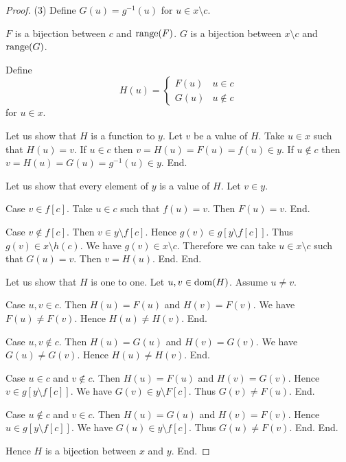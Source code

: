 \documentclass[../../sets-and-functions.ftl.tex]{subfiles}
\begin{document}
\begin{forthel}
\begin{proof}
        (3) Define $G(u) = g^{-1}(u)$ for $u \in x \setminus c$.

        $F$ is a bijection between $c$ and $\text{range}(F)$.
        $G$ is a bijection between $x \setminus c$ and $\text{range}(G)$.

        Define
          $$H(u) =
          \begin{cases}
            F(u) & u \in c \\
            G(u) & u \notin c
          \end{cases}$$
        for $u \in x$.

        Let us show that $H$ is a function to $y$.
          Let $v$ be a value of $H$.
          Take $u \in x$ such that $H(u) = v$.
          If $u \in c$ then $v = H(u) = F(u) = f(u) \in y$.
          If $u \notin c$ then $v = H(u) = G(u) = g^{-1}(u) \in y$.
        End.

        Let us show that every element of $y$ is a value of $H$.
          Let $v \in y$.

          Case $v \in f[c]$.
            Take $u \in c$ such that $f(u) = v$.
            Then $F(u) = v$.
          End.

          Case $v \notin f[c]$.
            Then $v \in y \setminus f[c]$.
            Hence $g(v) \in g[y \setminus f[c]]$.
            Thus $g(v) \in x \setminus h(c)$.
            We have $g(v) \in x \setminus c$.
            Therefore we can take $u \in x \setminus c$ such that $G(u) = v$.
            Then $v = H(u)$.
          End.
        End.

        Let us show that $H$ is one to one.
          Let $u,v \in \operatorname{dom}(H)$.
          Assume $u \neq v$.

          Case $u,v \in c$.
            Then $H(u) = F(u)$ and $H(v) = F(v)$.
            We have $F(u) \neq F(v)$.
            Hence $H(u) \neq H(v)$.
          End.

          Case $u,v \notin c$.
            Then $H(u) = G(u)$ and $H(v) = G(v)$.
            We have $G(u) \neq G(v)$.
            Hence $H(u) \neq H(v)$.
          End.

          Case $u \in c$ and $v \notin c$.
            Then $H(u) = F(u)$ and $H(v) = G(v)$.
            Hence $v \in g[y \setminus f[c]]$.
            We have $G(v) \in y \setminus F[c]$.
            Thus $G(v) \neq F(u)$.
          End.

          Case $u \notin c$ and $v \in c$.
            Then $H(u) = G(u)$ and $H(v) = F(v)$.
            Hence $u \in g[y \setminus f[c]]$.
            We have $G(u) \in y \setminus f[c]$.
            Thus $G(u) \neq F(v)$.
          End.
        End.

        Hence $H$ is a bijection between $x$ and $y$.
      End.
    \end{proof}
  \end{forthel}
\end{document}
